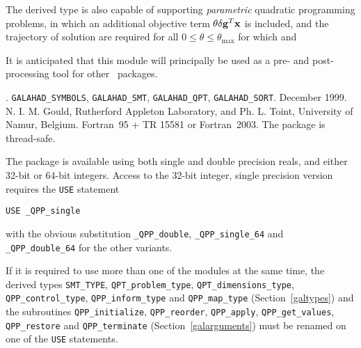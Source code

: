 \documentclass{galahad}
\newcommand{\packagename}{QPP}
\newcommand{\fullpackagename}{\libraryname\_\packagename}
\begin{document}
The derived type is also capable of supporting {\em parametric}
quadratic programming problems, in which an additional objective
term $\theta \delta {\mathbf{g}}^T {\mathbf{x}}$ is included, and the trajectory of 
solution are required for all $0 \leq \theta \leq \theta_{\max}$ 
for which
and 

It is anticipated that this module will principally be used as a pre- and 
post-processing tool for other \galahad\ packages.


\galattributes
\galversions{\tt  \fullpackagename\_single, \fullpackagename\_double}.
\galuses
{\tt GALAHAD\_SY\-M\-BOLS}, 
{\tt GALAHAD\_SMT}, 
{\tt GALAHAD\_QPT},
{\tt GALAHAD\_SORT}.
\galdate December 1999.
\galorigin N. I. M. Gould, Rutherford Appleton Laboratory, and
Ph. L. Toint, University of Namur, Belgium.
\gallanguage Fortran~95 + TR 15581 or Fortran~2003. 
The package is thread-safe.


\galhowto

The package is available using both single and double precision reals, 
and either 32-bit or 64-bit integers. Access to the 32-bit integer,
single precision version requires the {\tt USE} statement
\medskip

\hspace{8mm} {\tt USE \fullpackagename\_single}

\medskip
\noindent
with the obvious substitution {\tt \fullpackagename\_double},
{\tt \fullpackagename\_single\_64} and 
{\tt \fullpackagename\_double\_64} for the other variants.

\noindent
If it is required to use more than one of the modules at the same time, 
the derived types
{\tt SMT\_TYPE},
{\tt QPT\_problem\_type},
{\tt QPT\_dimensions\_type}, 
{\tt \packagename\_control\_type}, 
\sloppy
{\tt \packagename\_inform\_type} 
and
{\tt \packagename\_map\_type}
(Section~\ref{galtypes})
and the subroutines
{\tt \packagename\_initialize}, 
{\tt \packagename\_reorder},
{\tt \packagename\_apply}, 
{\tt \packagename\_get\_values}, 
{\tt \packagename\_restore}
and
{\tt \packagename\_terminate} 
(Section~\ref{galarguments})
must be renamed on one of the {\tt USE} statements.
\end{document}

